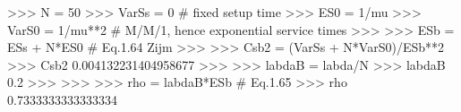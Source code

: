 
>>> N = 50
>>> VarSs = 0 # fixed setup time
>>> ES0 = 1/mu
>>> VarS0 = 1/mu**2 # M/M/1, hence exponential service times
>>>
>>> ESb = ESs + N*ES0 # Eq.1.64 Zijm
>>>
>>> Csb2 = (VarSs + N*VarS0)/ESb**2
>>> Csb2
0.004132231404958677
>>>
>>> labdaB = labda/N
>>> labdaB
0.2
>>>
>>>
>>> rho = labdaB*ESb # Eq.1.65
>>> rho
0.7333333333333334

